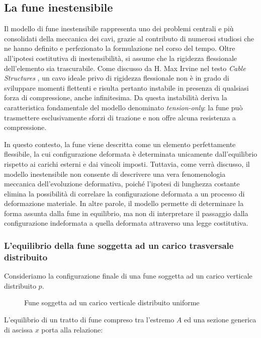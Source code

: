 \subsection{La fune inestensibile}
Il modello di fune inestensibile rappresenta uno dei problemi centrali e più consolidati della meccanica dei cavi, grazie al contributo di numerosi studiosi che ne hanno definito e perfezionato la formulazione nel corso del tempo. Oltre all'ipotesi costitutiva di inestensibilità, si assume che la rigidezza flessionale dell'elemento sia trascurabile. Come discusso da H. Max Irvine nel testo \textit{Cable Structures} \cite{irvine1981}, un cavo ideale privo di rigidezza flessionale non è in grado di sviluppare momenti flettenti e risulta pertanto instabile in presenza di qualsiasi forza di compressione, anche infinitesima. Da questa instabilità deriva la caratteristica fondamentale del modello denominato \textit{tension-only}: la fune può trasmettere esclusivamente sforzi di trazione e non offre alcuna resistenza a compressione.

In questo contesto, la fune viene descritta come un elemento perfettamente flessibile, la cui configurazione deformata è determinata unicamente dall'equilibrio rispetto ai carichi esterni e dai vincoli imposti. Tuttavia, come verrà discusso, il modello inestensibile non consente di descrivere una vera fenomenologia meccanica dell'evoluzione deformativa, poiché l'ipotesi di lunghezza costante elimina la possibilità di correlare la configurazione deformata a un processo di deformazione materiale. In altre parole, il modello permette di determinare la forma assunta dalla fune in equilibrio, ma non di interpretare il passaggio dalla configurazione indeformata a quella deformata attraverso una legge costitutiva.

\subsubsection{L'equilibrio della fune soggetta ad un carico trasversale distribuito}
Consideriamo la configurazione finale di una fune soggetta ad un carico verticale distribuito $p$. 

\begin{figure}[htbp]
    \centering
    
    \caption{Fune soggetta ad un carico verticale distribuito uniforme}
    \label{fig:fune_carico_distr}
\end{figure}
L'equilibrio di un tratto di fune compreso tra l'estremo $A$ ed una sezione generica di ascissa $x$ porta alla relazione: 

